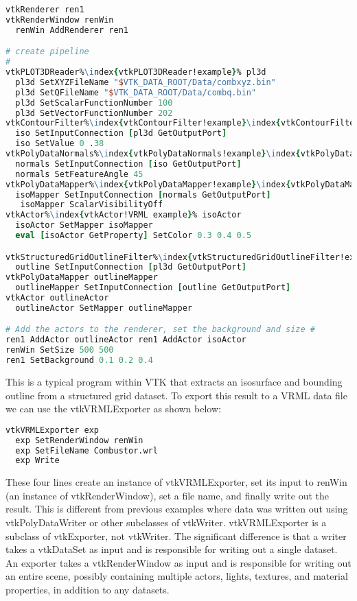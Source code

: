 \begin{lstlisting}[language=TCL, caption={}, numbers=none, frame=none, escapechar=\%]
%\index{vtkPLOT3DReader!VRML example}%
vtkRenderer ren1
vtkRenderWindow renWin
  renWin AddRenderer ren1

# create pipeline
#
vtkPLOT3DReader%\index{vtkPLOT3DReader!example}% pl3d
  pl3d SetXYZFileName "$VTK_DATA_ROOT/Data/combxyz.bin"
  pl3d SetQFileName "$VTK_DATA_ROOT/Data/combq.bin"
  pl3d SetScalarFunctionNumber 100
  pl3d SetVectorFunctionNumber 202
vtkContourFilter%\index{vtkContourFilter!example}\index{vtkContourFilter!VRML example}% iso
  iso SetInputConnection [pl3d GetOutputPort]
  iso SetValue 0 .38
vtkPolyDataNormals%\index{vtkPolyDataNormals!example}\index{vtkPolyDataNormals!VRML example}% normals
  normals SetInputConnection [iso GetOutputPort]
  normals SetFeatureAngle 45
vtkPolyDataMapper%\index{vtkPolyDataMapper!example}\index{vtkPolyDataMapper!VRML example}% isoMapper
  isoMapper SetInputConnection [normals GetOutputPort]
   isoMapper ScalarVisibilityOff
vtkActor%\index{vtkActor!VRML example}% isoActor
  isoActor SetMapper isoMapper
  eval [isoActor GetProperty] SetColor 0.3 0.4 0.5

vtkStructuredGridOutlineFilter%\index{vtkStructuredGridOutlineFilter!example}% outline
  outline SetInputConnection [pl3d GetOutputPort]
vtkPolyDataMapper outlineMapper
  outlineMapper SetInputConnection [outline GetOutputPort]
vtkActor outlineActor
  outlineActor SetMapper outlineMapper

# Add the actors to the renderer, set the background and size #
ren1 AddActor outlineActor ren1 AddActor isoActor
renWin SetSize 500 500
ren1 SetBackground 0.1 0.2 0.4
\end{lstlisting}

This is a typical program within VTK that extracts an isosurface and bounding outline from a structured grid dataset. To export this result to a VRML data file we can use the vtkVRMLExporter as shown below:

\begin{lstlisting}[language=TCL, caption={}, numbers=none, frame=none]
vtkVRMLExporter exp
  exp SetRenderWindow renWin
  exp SetFileName Combustor.wrl
  exp Write
\end{lstlisting}

These four lines create an instance of vtkVRMLExporter, set its input to renWin (an instance of vtkRenderWindow), set a file name, and finally write out the result. This is different from previous examples where data was written out using vtkPolyDataWriter or other subclasses of vtkWriter. vtkVRMLExporter is a subclass of vtkExporter, not vtkWriter. The significant difference is that a writer takes a vtkDataSet as input and is responsible for writing out a single dataset. An exporter takes a vtkRenderWindow as input and is responsible for writing out an entire scene, possibly containing multiple actors, lights, textures, and material properties, in addition to any datasets.


